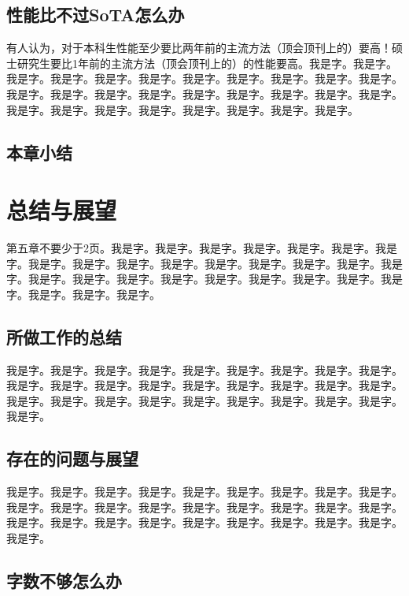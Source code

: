 \documentclass[supercite]{Experimental_Report}
\theoremstyle{definition}
\begin{document}
\subsection{性能比不过SoTA怎么办}


有人认为，对于本科生性能至少要比两年前的主流方法（顶会顶刊上的）要高\cite{STR2021Neurocom}！硕士研究生要比1年前的主流方法（顶会顶刊上的）的性能要高。我是字。我是字。我是字。我是字。我是字。我是字。我是字。我是字。我是字。我是字。我是字。我是字。我是字。我是字。我是字。我是字。我是字。我是字。我是字。我是字。我是字。我是字。我是字。我是字。我是字。我是字。我是字。我是字。

\subsection{本章小结}

\newpage

\section{总结与展望}

第五章不要少于2页。我是字。我是字。我是字。我是字。我是字。我是字。我是字。我是字。我是字。我是字。我是字。我是字。我是字。我是字。我是字。我是字。我是字。我是字。我是字。我是字。我是字。我是字。我是字。我是字。我是字。我是字。我是字。我是字。

\subsection{所做工作的总结}

我是字。我是字。我是字。我是字。我是字。我是字。我是字。我是字。我是字。我是字。我是字。我是字。我是字。我是字。我是字。我是字。我是字。我是字。我是字。我是字。我是字。我是字。我是字。我是字。我是字。我是字。我是字。我是字。

\subsection{存在的问题与展望}

我是字。我是字。我是字。我是字。我是字。我是字。我是字。我是字。我是字。我是字。我是字。我是字。我是字。我是字。我是字。我是字。我是字。我是字。我是字。我是字。我是字。我是字。我是字。我是字。我是字。我是字。我是字。我是字。

\subsection{字数不够怎么办}
\end{document}
